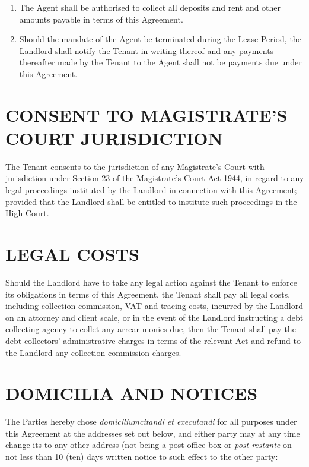 \documentclass[11pt]{article}
\begin{document}
\begin{enumerate}
	\item The Agent shall be authorised to collect all deposits and rent and other amounts payable in terms of this Agreement.
	\item Should the mandate of the Agent be terminated during the Lease Period, the Landlord shall notify the Tenant in writing thereof and any payments thereafter made by the Tenant to the Agent shall not be payments due under this Agreement.
\end{enumerate}

\section{\uppercase{consent to magistrate's court jurisdiction}}
\label{sec:magistrate-court}

The Tenant consents to the jurisdiction of any Magistrate's Court with jurisdiction under Section 23 of the Magistrate's Court Act 1944, in regard to any legal proceedings instituted by the Landlord in connection with this Agreement; provided that the Landlord shall be entitled to institute such proceedings in the High Court.

\section{\uppercase{legal costs}}
\label{sec:legal-costs}

Should the Landlord have to take any legal action against the Tenant to enforce its obligations in terms of this Agreement, the Tenant shall pay all legal costs, including collection commission, VAT and tracing costs, incurred by the Landlord on an attorney and client scale, or in the event of the Landlord instructing a debt collecting agency to collet any arrear  monies due, then the Tenant shall pay the debt collectors' administrative charges in terms of the relevant Act and refund to the Landlord any collection commission charges.

\section{\uppercase{domicilia and notices}}
\label{sec:notices}

The Parties hereby chose \textit{domiciliumcitandi et executandi} for all purposes under this Agreement at the addresses set out below, and either party may at any time change its  to any other address (not being a post office box or \textit{post restante} on not less than 10 (ten) days written notice to such effect to the other party: \\
\end{document}
